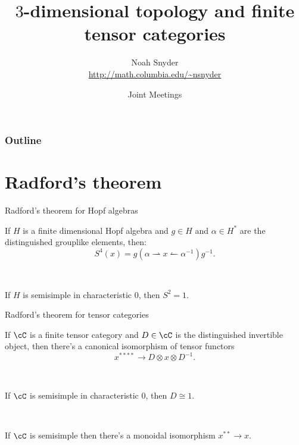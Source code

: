 \documentclass[beamer]{beamer}
\author[Noah Snyder]{Noah Snyder \\ \url{http://math.columbia.edu/~nsnyder}}
\title{$3$-dimensional topology and finite tensor categories}
\date{Joint Meetings}
\begin{document}
\frame{\titlepage}

\begin{frame}
       \frametitle{Outline}
       \tableofcontents
\end{frame}

\beamertemplatetransparentcovered 


\beamersetuncovermixins 
{} 
{} 



\section{Radford's theorem}

\begin{frame}{Radford's theorem for Hopf algebras}

\begin{theorem}[Radford 75]
If $H$ is a finite dimensional Hopf algebra and $g \in H$ and $\alpha \in H^*$ are the distinguished grouplike elements, then:
$$S^4(x) = g (\alpha \rightharpoonup x \leftharpoonup  \alpha^{-1}) g^{-1}.$$
\end{theorem}

\

\begin{theorem}
If $H$ is semisimple in characteristic $0$, then $S^2 = 1$.
\end{theorem}


\end{frame}

\begin{frame}{Radford's theorem for tensor categories}

\begin{theorem}[ENO 04]
If $\cC$ is a finite tensor category and $D \in \cC$ is the distinguished invertible object, then there's a canonical isomorphism of tensor functors
$$x^{****}  \rightarrow D \otimes x \otimes D^{-1}.$$
\end{theorem}

\

\begin{theorem}[ENO 04]
If $\cC$ is semisimple in characteristic $0$, then $D \cong 1$.
\end{theorem}

\

\begin{conj}[ENO 02]
If $\cC$ is semisimple then there's a monoidal isomorphism $x^{**} \rightarrow x$.
\end{conj}
\end{frame}
\end{document}
